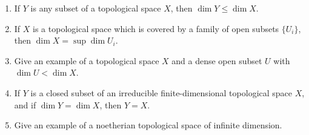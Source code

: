 \label{1.1.10}

\begin{enumerate}[label = (\alph*)]
    \item If $Y$ is any subset of a topological space $X$, then $\dim Y \leq \dim X$.
    
    \item If $X$ is a topological space which is covered by a family of open subsets $\{U_i\}$, then $\dim X = \sup \dim U_i$.
    
    \item Give an example of a topological space $X$ and a dense open subset $U$ with $\dim U < \dim X$.
    
    \item If $Y$ is a closed subset of an irreducible finite-dimensional topological space $X$, and if $\dim Y = \dim X$, then $Y = X$.
    
    \item Give an example of a noetherian topological space of infinite dimension.
\end{enumerate}

